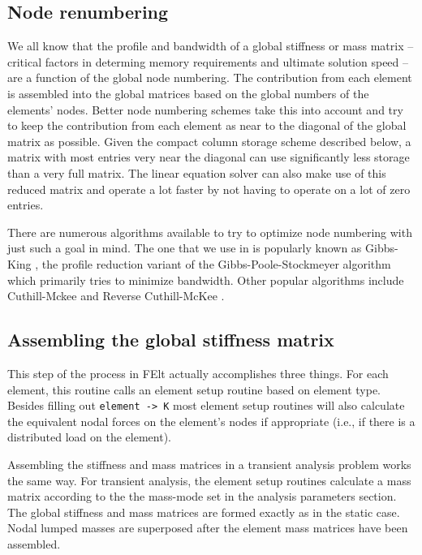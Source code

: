 \subsection{Node renumbering}
We all know that the profile and bandwidth of a global stiffness or mass
matrix -- critical factors in determing memory requirements and ultimate
solution speed -- are a function of the global node numbering.  The 
contribution from each element is assembled into the global matrices
based on the global numbers of the elements' nodes.  Better node numbering
schemes take this into account and try to keep the contribution from each
element as near to the diagonal of the global matrix as possible.  Given
the compact column storage scheme described below, a matrix with most
entries very near the diagonal can use significantly less storage than
a very full matrix. The linear equation solver can also make use of this
reduced matrix and operate a lot faster by not having to operate on a lot
of zero entries. 

There are numerous algorithms available to try to optimize node numbering
with just such a goal in mind.  The one that we use in \felt{} is popularly
known as
Gibbs-King \cite{gk:renumbering}, the profile reduction variant of the
Gibbs-Poole-Stockmeyer algorithm \cite{gps:renumbering} which primarily
tries to minimize bandwidth.  Other popular algorithms include 
Cuthill-Mckee \cite{cm:renumbering} and 
Reverse Cuthill-McKee \cite{rcm:renumbering}.

\subsection{Assembling the global stiffness matrix}
This step of the process in FElt actually accomplishes three things.
For each element, this routine calls an element setup routine
based on element type.  Besides filling out \mbox{{\tt element -> K}} most
element setup routines will also calculate the equivalent
nodal forces on the element's nodes if appropriate (i.e., if there is
a distributed load on the element).  

Assembling the stiffness and mass matrices in a transient analysis problem
works the same way.  For transient analysis, the element setup routines
calculate a mass matrix according to the the mass-mode set in the analysis
parameters section.  The global stiffness and mass matrices are formed
exactly as in the static case.  Nodal lumped masses are superposed after
the element mass matrices have been assembled.  


